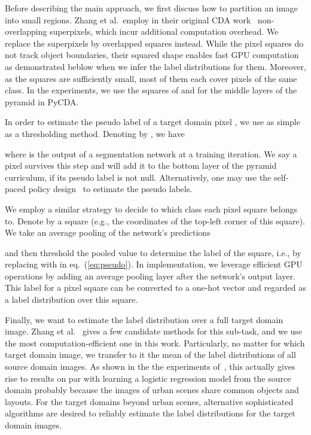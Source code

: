 \documentclass[10pt,twocolumn,letterpaper]{article}
\begin{document}
\vspace{3pt}
Before describing the main approach, we first discuss how to partition an image into small regions. Zhang et al.\ employ in their original CDA work~\cite{curriculum_tpami} non-overlapping superpixels, which incur additional computation overhead. We replace the superpixels by overlapped squares instead. While the pixel squares do not track object boundaries, their squared shape enables fast GPU computation as demonstrated beblow when we infer the label distributions for them. Moreover, as the squares are sufficiently small, most of them each cover pixels of the same class.  In the experiments, we use the squares of  and  for the middle layers of the pyramid in PyCDA. 

\vspace{3pt}
In order to estimate the pseudo label  of a target domain pixel , we use as simple as a thresholding method. Denoting by , we have

\vspace{-0.3cm}

\noindent where  is the output of a segmentation network at a training iteration. We say a pixel survives this step and will add it to the bottom layer of the pyramid curriculum, if its pseudo label is not null. Alternatively, one may use the self-paced policy design~\cite{self_motivated_2018_ECCV} to estimate the pseudo labels.

We employ a similar strategy to decide to which class each pixel square belongs to. Denote by  a  square (e.g., the coordinates of the top-left corner of this square). We take an average pooling of the network's predictions

and then threshold the pooled value  to determine the label of the square, i.e., by replacing  with  in eq.~(\ref{eq:pseudo}). In implementation, we leverage efficient GPU operations by adding an average pooling layer after the network's output layer. This label for a pixel square can be converted to a one-hot vector and regarded as a label distribution over this square.

Finally, we want to estimate the label distribution over a full target domain image. Zhang et al.~\cite{curriculum_tpami} gives a few candidate methods for this sub-task, and we use the most computation-efficient one in this work. Particularly, no matter for which target domain image, we transfer to it the mean of the label distributions of all source domain images.  As shown in the the experiments of~\cite{curriculum_tpami}, this actually gives rise to results on par with learning a logistic regression model from the source domain probably because the images of urban scenes share common objects and layouts. For the target domains beyond urban scenes, alternative sophisticated algorithms are desired to reliably estimate the label distributions for the target domain images.
\end{document}
